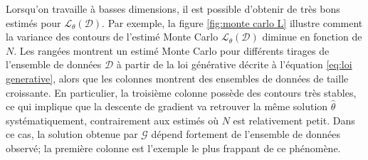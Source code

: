Lorsqu'on travaille à basses dimensions, il est possible d'obtenir de très bons estimés pour $\mathcal{L}_\theta(\mathcal{D})$. 
Par exemple, la figure \ref{fig:monte carlo L} illustre comment 
la variance des contours de l'estimé Monte Carlo $\mathcal{L}_{\theta}(\mathcal{D})$ diminue en fonction de $N$. 
Les rangées montrent un estimé Monte Carlo pour différents tirages de l'ensemble de données $\mathcal{D}$ à partir 
de la loi générative décrite à l'équation \eqref{eq:loi generative}, alors que les colonnes montrent  
des ensembles de données de taille croissante. En particulier, la troisième colonne possède des contours très stables, ce qui 
implique que la descente de gradient va retrouver la même solution $\hat{\theta}$ systématiquement, 
contrairement aux estimés où $N$ est relativement petit. Dans ce cas, la solution obtenue par $\mathcal{G}$ 
dépend fortement de l'ensemble de données observé; la première colonne est l'exemple le plus frappant de ce phénomène.



